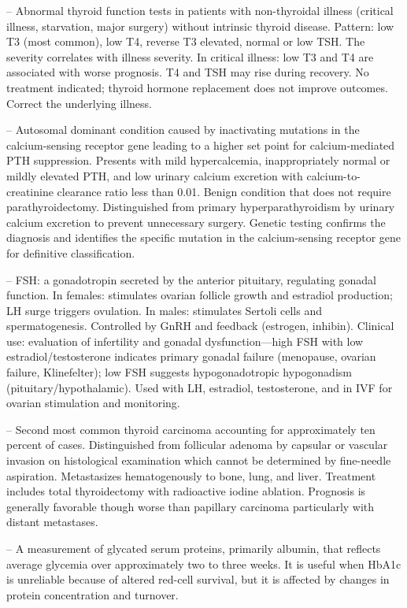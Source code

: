 -- Abnormal thyroid function tests in patients with non-thyroidal illness (critical illness, starvation, major surgery) without intrinsic thyroid disease. Pattern: low T3 (most common), low T4, reverse T3 elevated, normal or low TSH. The severity correlates with illness severity. In critical illness: low T3 and T4 are associated with worse prognosis. T4 and TSH may rise during recovery. No treatment indicated; thyroid hormone replacement does not improve outcomes. Correct the underlying illness.

-- Autosomal dominant condition caused by inactivating mutations in the calcium-sensing receptor gene leading to a higher set point for calcium-mediated PTH suppression. Presents with mild hypercalcemia, inappropriately normal or mildly elevated PTH, and low urinary calcium excretion with calcium-to-creatinine clearance ratio less than 0.01. Benign condition that does not require parathyroidectomy. Distinguished from primary hyperparathyroidism by urinary calcium excretion to prevent unnecessary surgery. Genetic testing confirms the diagnosis and identifies the specific mutation in the calcium-sensing receptor gene for definitive classification.

-- FSH: a gonadotropin secreted by the anterior pituitary, regulating gonadal function. In females: stimulates ovarian follicle growth and estradiol production; LH surge triggers ovulation. In males: stimulates Sertoli cells and spermatogenesis. Controlled by GnRH and feedback (estrogen, inhibin). Clinical use: evaluation of infertility and gonadal dysfunction—high FSH with low estradiol/testosterone indicates primary gonadal failure (menopause, ovarian failure, Klinefelter); low FSH suggests hypogonadotropic hypogonadism (pituitary/hypothalamic). Used with LH, estradiol, testosterone, and in IVF for ovarian stimulation and monitoring.

-- Second most common thyroid carcinoma accounting for approximately ten percent of cases. Distinguished from follicular adenoma by capsular or vascular invasion on histological examination which cannot be determined by fine-needle aspiration. Metastasizes hematogenously to bone, lung, and liver. Treatment includes total thyroidectomy with radioactive iodine ablation. Prognosis is generally favorable though worse than papillary carcinoma particularly with distant metastases.

-- A measurement of glycated serum proteins, primarily albumin, that reflects average glycemia over approximately two to three weeks. It is useful when HbA1c is unreliable because of altered red-cell survival, but it is affected by changes in protein concentration and turnover.

